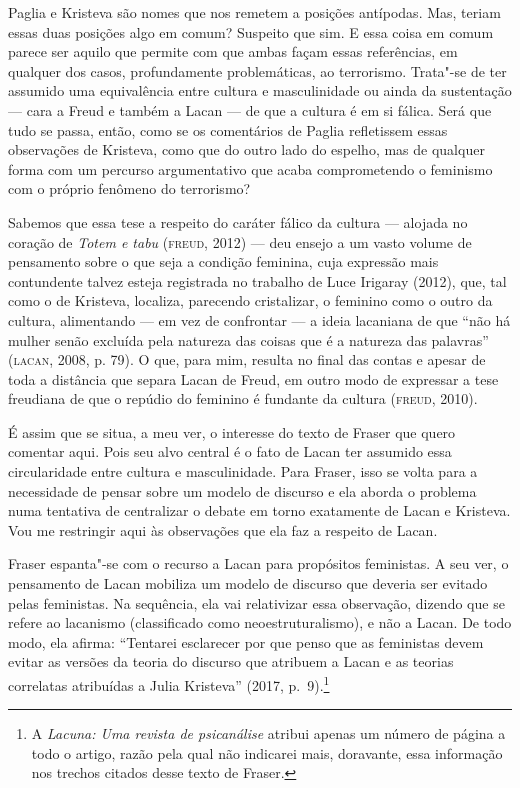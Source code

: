 Paglia e Kristeva são nomes que nos remetem a posições antípodas. Mas,
teriam essas duas posições algo em comum? Suspeito que sim. E essa coisa
em comum parece ser aquilo que permite com que ambas façam essas
referências, em qualquer dos casos, profundamente problemáticas, ao
terrorismo. Trata"-se de ter assumido uma equivalência entre cultura e
masculinidade ou ainda da sustentação --- cara a Freud e também a Lacan
--- de que a cultura é em si fálica. Será que tudo se passa, então, como
se os comentários de Paglia refletissem essas observações de Kristeva,
como que do outro lado do espelho, mas de qualquer forma com um percurso
argumentativo que acaba comprometendo o feminismo com o próprio fenômeno
do terrorismo?

Sabemos que essa tese a respeito do caráter fálico da cultura --- alojada
no coração de \emph{Totem e tabu} (\textsc{freud}, 2012) --- deu ensejo
a um vasto volume de pensamento sobre o que seja a condição feminina,
cuja expressão mais contundente talvez esteja registrada no trabalho de
Luce Irigaray (2012), que, tal como o de Kristeva, localiza,
parecendo cristalizar, o feminino como o outro da cultura, alimentando
--- em vez de confrontar --- a ideia lacaniana de que ``não há
mulher senão excluída pela natureza das coisas que é a natureza das
palavras'' (\textsc{lacan}, 2008, p. 79). O que, para mim,
resulta no final das contas e apesar de toda a distância que separa
Lacan de Freud, em outro modo de expressar a tese freudiana de que o
repúdio do feminino é fundante da cultura (\textsc{freud}, 2010).

É assim que se situa, a meu ver, o interesse do texto de Fraser que
quero comentar aqui. Pois seu alvo central é o fato de Lacan ter
assumido essa circularidade entre cultura e masculinidade. Para Fraser,
isso se volta para a necessidade de pensar sobre um modelo de discurso e
ela aborda o problema numa tentativa de centralizar o debate em torno
exatamente de Lacan e Kristeva. Vou me restringir aqui às observações
que ela faz a respeito de Lacan.

Fraser espanta"-se com o recurso a Lacan para propósitos feministas. A
seu ver, o pensamento de Lacan mobiliza um modelo de discurso que
deveria ser evitado pelas feministas. Na sequência, ela vai relativizar
essa observação, dizendo que se refere ao lacanismo (classificado como
neoestruturalismo), e não a Lacan. De todo modo, ela afirma:
``Tentarei esclarecer por que penso que as feministas devem evitar
as versões da teoria do discurso que atribuem a Lacan e as teorias
correlatas atribuídas a Julia Kristeva'' (2017, p.~9).\footnote{A
  \emph{Lacuna: Uma revista de psicanálise} atribui apenas um número de
  página a todo o artigo, razão pela qual não indicarei mais, doravante,
  essa informação nos trechos citados desse texto de Fraser.}


